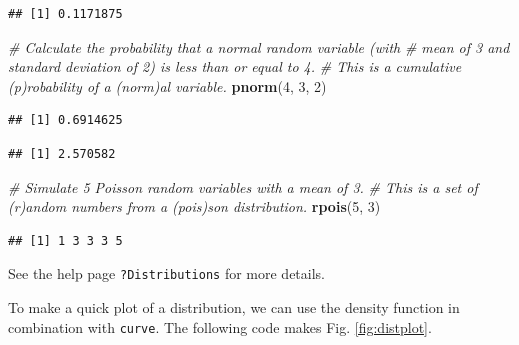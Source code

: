 \documentclass[]{book}
\newenvironment{Shaded}{\begin{snugshade}}{\end{snugshade}}
\newcommand{\CommentTok}[1]{\textcolor[rgb]{0.56,0.35,0.01}{\textit{#1}}}
\newcommand{\DecValTok}[1]{\textcolor[rgb]{0.00,0.00,0.81}{#1}}
\newcommand{\FloatTok}[1]{\textcolor[rgb]{0.00,0.00,0.81}{#1}}
\newcommand{\KeywordTok}[1]{\textcolor[rgb]{0.13,0.29,0.53}{\textbf{#1}}}
\newcommand{\NormalTok}[1]{#1}
\begin{document}
\begin{verbatim}
## [1] 0.1171875
\end{verbatim}

\begin{Shaded}
\begin{Highlighting}[]
\CommentTok{# Calculate the probability that a normal random variable (with }
\CommentTok{# mean of 3 and standard deviation of 2) is less than or equal to 4.}
\CommentTok{# This is a cumulative (p)robability of a (norm)al variable.}
\KeywordTok{pnorm}\NormalTok{(}\DecValTok{4}\NormalTok{, }\DecValTok{3}\NormalTok{, }\DecValTok{2}\NormalTok{)}
\end{Highlighting}
\end{Shaded}

\begin{verbatim}
## [1] 0.6914625
\end{verbatim}

\begin{Shaded}
\end{Shaded}

\begin{verbatim}
## [1] 2.570582
\end{verbatim}

\begin{Shaded}
\begin{Highlighting}[]
\CommentTok{# Simulate 5 Poisson random variables with a mean of 3. }
\CommentTok{# This is a set of (r)andom numbers from a (pois)son distribution.}
\KeywordTok{rpois}\NormalTok{(}\DecValTok{5}\NormalTok{, }\DecValTok{3}\NormalTok{)}
\end{Highlighting}
\end{Shaded}

\begin{verbatim}
## [1] 1 3 3 3 5
\end{verbatim}

See the help page \texttt{?Distributions} for more details.

To make a quick plot of a distribution, we can use the density function in combination with \texttt{curve}. The following code makes Fig. \ref{fig:distplot}.
\end{document}
